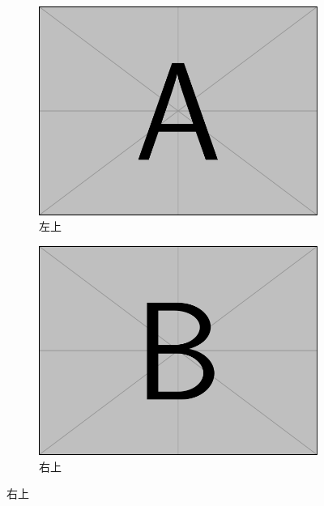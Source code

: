 \documentclass[12pt]{ctexart}
\begin{document}
\begin{figure}[!htbp]
	\centering
	\begin{subfigure}[t]{0.4\textwidth}
		\centering
		\includegraphics[width=\textwidth]{img/example-image-a.pdf}
		\caption{左上}
		\label{}
	\end{subfigure}
	\begin{subfigure}[t]{0.4\textwidth}
		\centering
		\includegraphics[width=\textwidth]{img/example-image-b.pdf}
		\caption{右上}
		\label{}
	\end{subfigure}

\end{figure}
\end{document}
